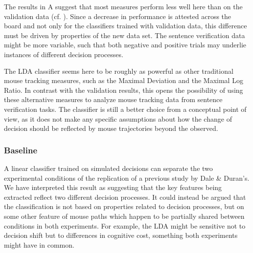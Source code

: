 \documentclass[11pt]{article}
\begin{document}
The results in A suggest that most measures perform less well here than on the validation data (cf. ). 
Since a decrease in performance is attested across the board and not only for the classifiers trained with validation data, this difference must be driven by properties of the new data set. The sentence verification data might be more variable, such that both negative and positive trials may underlie instances of different decision processes. 

The LDA classifier seems here to be roughly as powerful as other traditional mouse tracking measures, such as the Maximal Deviation and the Maximal Log Ratio. In contrast with the validation results, this opens the possibility of using these alternative measures to analyze mouse tracking data from sentence verification tasks. The classifier is still a better choice from a conceptual point of view, as it does not make any specific assumptions about how the change of decision should be reflected by mouse trajectories beyond the observed.

\subsubsection{Baseline}
A linear classifier trained on simulated decisions can separate the two experimental conditions of the replication of a previous study by Dale \& Duran's. We have interpreted this result as suggesting that the key features being extracted reflect two different decision processes. It could instead be argued that the classification is not based on properties related to decision processes, but on some other feature of mouse paths which happen to be partially shared between conditions in both experiments. 
For example, the LDA might be sensitive not to decision shift but to differences in cognitive cost, something both experiments might have in common.
\end{document}
